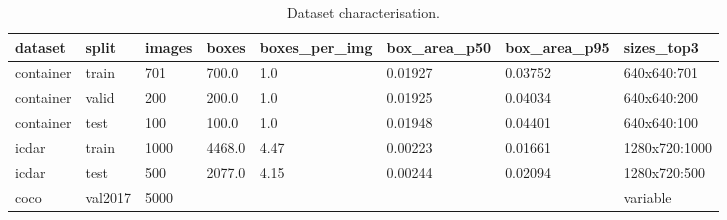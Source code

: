 \begin{table}[t]
\centering
\caption{Dataset characterisation.}\label{tab:data}
\begin{tabular}{llllllll}
\toprule
\textbf{dataset} & \textbf{split} & \textbf{images} & \textbf{boxes} & \textbf{boxes\_per\_img} & \textbf{box\_area\_p50} & \textbf{box\_area\_p95} & \textbf{sizes\_top3} \\
\midrule
container & train & 701 & 700.0 & 1.0 & 0.01927 & 0.03752 & 640x640:701 \\
container & valid & 200 & 200.0 & 1.0 & 0.01925 & 0.04034 & 640x640:200 \\
container & test & 100 & 100.0 & 1.0 & 0.01948 & 0.04401 & 640x640:100 \\
icdar & train & 1000 & 4468.0 & 4.47 & 0.00223 & 0.01661 & 1280x720:1000 \\
icdar & test & 500 & 2077.0 & 4.15 & 0.00244 & 0.02094 & 1280x720:500 \\
coco & val2017 & 5000 &  &  &  &  & variable \\
\bottomrule
\end{tabular}
\end{table}
